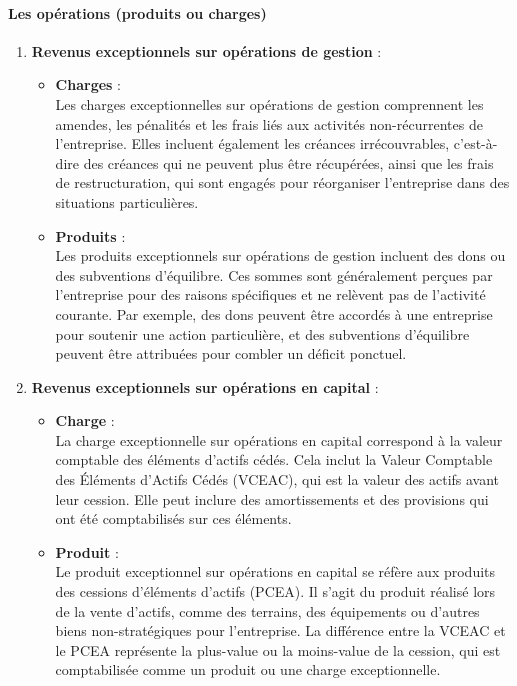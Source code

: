 \documentclass[a4paper, 12pt]{report}
\begin{document}
\paragraph{Les opérations (produits ou charges)}

\begin{enumerate}
	\item \textbf{Revenus exceptionnels sur opérations de gestion} :
	\begin{itemize}
		\item \textbf{Charges} :\\
		Les charges exceptionnelles sur opérations de gestion comprennent les amendes, les pénalités et les frais liés aux activités non-récurrentes de l’entreprise. Elles incluent également les créances irrécouvrables, c'est-à-dire des créances qui ne peuvent plus être récupérées, ainsi que les frais de restructuration, qui sont engagés pour réorganiser l'entreprise dans des situations particulières.
		
		\item \textbf{Produits} :\\
		Les produits exceptionnels sur opérations de gestion incluent des dons ou des subventions d’équilibre. Ces sommes sont généralement perçues par l’entreprise pour des raisons spécifiques et ne relèvent pas de l'activité courante. Par exemple, des dons peuvent être accordés à une entreprise pour soutenir une action particulière, et des subventions d'équilibre peuvent être attribuées pour combler un déficit ponctuel.
	\end{itemize}
	
	\item \textbf{Revenus exceptionnels sur opérations en capital} :
	\begin{itemize}
		\item \textbf{Charge} :\\
		La charge exceptionnelle sur opérations en capital correspond à la valeur comptable des éléments d'actifs cédés. Cela inclut la Valeur Comptable des Éléments d'Actifs Cédés (VCEAC), qui est la valeur des actifs avant leur cession. Elle peut inclure des amortissements et des provisions qui ont été comptabilisés sur ces éléments.
		
		\item \textbf{Produit} :\\
		Le produit exceptionnel sur opérations en capital se réfère aux produits des cessions d'éléments d'actifs (PCEA). Il s'agit du produit réalisé lors de la vente d'actifs, comme des terrains, des équipements ou d'autres biens non-stratégiques pour l'entreprise. La différence entre la VCEAC et le PCEA représente la plus-value ou la moins-value de la cession, qui est comptabilisée comme un produit ou une charge exceptionnelle.
	\end{itemize}
	

\end{enumerate}
\end{document}
